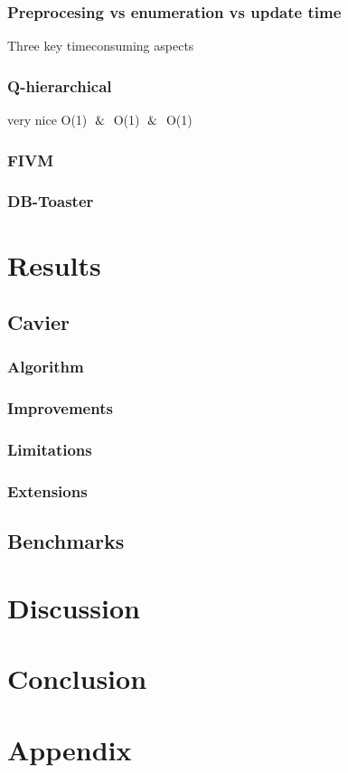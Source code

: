 \documentclass[abstracton,12pt]{scrreprt}
\begin{document}
\subsection{Preprocesing vs enumeration vs update time}
Three key timeconsuming aspects

\subsection{Q-hierarchical}
very nice
O(1) $\And$ O(1) $\And$ O(1)

\subsection{FIVM}
\subsection{DB-Toaster}

\chapter{Results}
\section{Cavier}
\subsection{Algorithm}
\subsection{Improvements}
\subsection{Limitations}
\subsection{Extensions}
\section{Benchmarks}

\chapter{Discussion}

\chapter{Conclusion}

\chapter{Appendix}

\printbibliography
\end{document}
